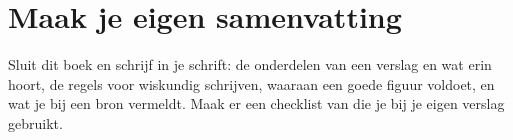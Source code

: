 \begin{oefeningen}




\end{oefeningen}


\ifzelfstudie
\section*{Maak je eigen samenvatting}
Sluit dit boek en schrijf in je schrift: de onderdelen van een verslag en wat erin hoort, de regels voor wiskundig schrijven, waaraan een goede figuur voldoet, en wat je bij een bron vermeldt. Maak er een checklist van die je bij je eigen verslag gebruikt.
\fi
